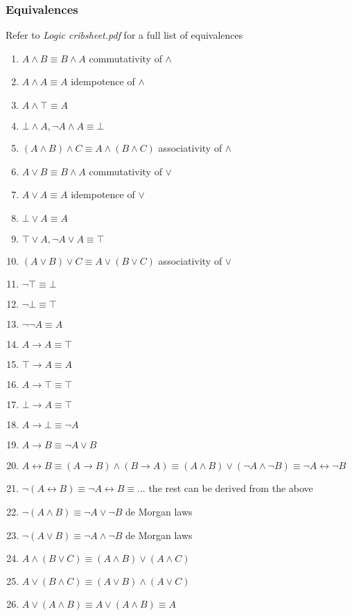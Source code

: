 \documentclass[a4paper, 12pt]{article}
\begin{document}
        \subsubsection*{Equivalences}
        Refer to \textit{Logic cribsheet.pdf} for a full list of equivalences
        \begin{enumerate}[1.]
            \item $A \land B \equiv B \land A$ \hfill commutativity of $\land$
            \item $A \land A \equiv A$ \hfill idempotence of $\land$
            \item $A \land \top \equiv A$
            \item $\bot \land A, \neg A \land A \equiv \bot$
            \item $(A \land B) \land C \equiv A \land (B \land C)$ \hfill associativity of $\land$
            \item $A \lor B \equiv B \land A$ \hfill commutativity of $\lor$
            \item $A \lor A \equiv A$ \hfill idempotence of $\lor$
            \item $\bot \lor A \equiv A$
            \item $\top \lor A, \neg A \lor A \equiv \top$
            \item $(A \lor B) \lor C \equiv A \lor (B \lor C)$ \hfill associativity of $\lor$
            \item $\neg \top \equiv \bot$
            \item $\neg \bot \equiv \top$
            \item $\neg \neg A \equiv A$
            \item $A \rightarrow A \equiv \top$
            \item $\top \rightarrow A \equiv A$
            \item $A \rightarrow \top \equiv \top$
            \item $\bot \rightarrow A \equiv \top$
            \item $A \rightarrow \bot \equiv \neg A$
            \item $A \rightarrow B \equiv \neg A \lor B$
            \item $A \leftrightarrow B \equiv (A \rightarrow B) \land (B \rightarrow A) \equiv (A \land B) \lor (\neg A \land \neg B) \equiv \neg A \leftrightarrow \neg B$
            \item $\neg (A \leftrightarrow B) \equiv \neg A \leftrightarrow B \equiv ...$ \hfill the rest can be derived from the above
            \item $\neg (A \land B) \equiv \neg A \lor \neg B$ \hfill de Morgan laws
            \item $\neg (A \lor B) \equiv \neg A \land \neg B$ \hfill de Morgan laws
            \item $A \land (B \lor C) \equiv (A \land B) \lor (A \land C)$
            \item $A \lor (B \land C) \equiv (A \lor B) \land (A \lor C)$
            \item $A \lor (A \land B) \equiv A \lor (A \land B) \equiv A$
        \end{enumerate}
\end{document}
